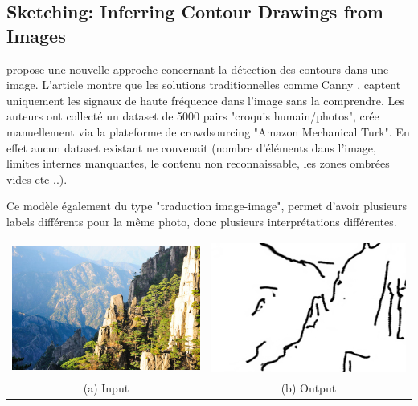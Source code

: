 \documentclass[a4paper, 12pt]{report}
\begin{document}
\subsection{Sketching: Inferring Contour Drawings from Images}
\cite{DBLP:journals/corr/abs-1901-00542} propose une nouvelle approche concernant la détection des contours dans une image. L'article montre que les solutions traditionnelles comme Canny \cite{4767851} , captent uniquement les signaux de haute fréquence dans l’image sans la comprendre. Les auteurs ont collecté un dataset de 5000 pairs "croquis humain/photos", crée manuellement via la plateforme de crowdsourcing "Amazon Mechanical Turk". En effet aucun dataset existant ne convenait (nombre d'éléments dans l'image, limites internes manquantes, le contenu non reconnaissable, les zones ombrées vides etc ..).

Ce modèle également du type "traduction image-image", permet d'avoir plusieurs labels différents pour la même photo, donc plusieurs interprétations différentes.

\begin{center}
  \centering
  \begin{tabular}{cc}
    \includegraphics[height=0.15\textheight]{images/sketching-input.jpg}&
    \includegraphics[height=0.15\textheight]{images/sketchy2.png}\\
    (a) Input &(b) Output
  \end{tabular}
\end{center}
\end{document}
